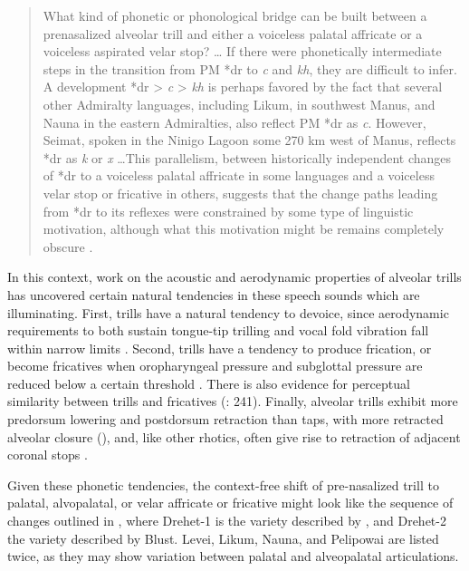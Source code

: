 \documentclass[output=paper]{langscibook}
\begin{document}
\begin{quote}
What kind of phonetic or phonological bridge can be built between a prenasalized alveolar trill and either a voiceless palatal affricate or a voiceless aspirated velar stop? … If there were phonetically intermediate steps in the transition from PM *dr to \textit{c} and \textit{kh}, they are difficult to infer. A development *dr > \textit{c} > \textit{kh} is perhaps favored by the fact that several other Admiralty languages, including Likum, in southwest Manus, and Nauna in the eastern Admiralties, also reflect PM *dr as \textit{c}. However, Seimat, spoken in the Ninigo Lagoon some 270 km west of Manus, reflects *dr as \textit{k} or \textit{x} …This parallelism, between historically independent changes of *dr to a voiceless palatal affricate in some languages and a voiceless velar stop or fricative in others, suggests that the change paths leading from *dr to its reflexes were constrained by some type of linguistic motivation, although what this motivation might be remains completely obscure \citep[248]{Blust2005}.
\end{quote}

In this context, work on the acoustic and aerodynamic properties of alveolar trills has uncovered certain natural tendencies in these speech sounds which are illuminating. First, trills have a natural tendency to devoice, since aerodynamic requirements to both sustain tongue-tip trilling and vocal fold vibration fall within narrow limits \citep{Solé2002}. Second, trills have a tendency to produce frication, or become fricatives when oropharyngeal pressure and subglottal pressure are reduced below a certain threshold \citep[682--684]{Solé2002}. There is also evidence for perceptual similarity between trills and fricatives (\citealt{LadefogedMaddieson1996}: 241). Finally, alveolar trills exhibit more predorsum lowering and postdorsum retraction than taps, with more retracted alveolar closure (\citealt{RecasensPallarès1999}), and, like other rhotics, often give rise to retraction of adjacent coronal stops \citep{SmithEtAl2019}.

Given these phonetic tendencies, the context-free shift of pre-nasalized trill to palatal, alvopalatal, or velar affricate or fricative might look like the sequence of changes outlined in , where Drehet-1 is the variety described by \citet{Beard1992}, and Drehet-2 the variety described by Blust. Levei, Likum, Nauna, and Pelipowai are listed twice, as they may show variation between palatal and alveopalatal articulations.
\end{document}
